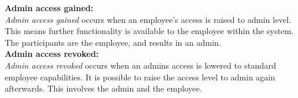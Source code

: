 \textbf{Admin access gained:}\\
\textit{Admin access gained} occurs when an employee's access is raised to admin level. This means further functionality is available to the employee within the system. The participants are the employee, and results in an admin.\\

\textbf{Admin access revoked:}\\
\textit{Admin access revoked} occurs when an admins access is lowered to standard employee capabilities. It is possible to raise the access level to admin again afterwards. This involves the admin and the employee.\\




